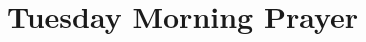 \documentclass[12pt,twocolumn]{book}
\begin{document}







\section{Tuesday Morning Prayer}





\end{document}

